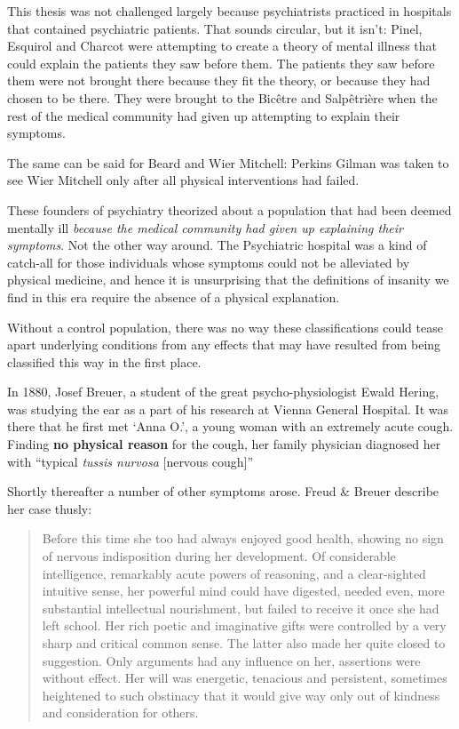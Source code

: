 \begin{refsection}
This thesis was not challenged largely because psychiatrists practiced in hospitals that contained psychiatric patients. That sounds circular, but it isn't: Pinel, Esquirol and Charcot were attempting to create a theory of mental illness that could explain the patients they saw before them. The patients they saw before them were not brought there because they fit the theory, or because they had chosen to be there. They were brought to the Bicêtre and Salpêtrière when the rest of the medical community had given up attempting to explain their symptoms.

The same can be said for Beard and Wier Mitchell: Perkins Gilman was taken to see Wier Mitchell only after all physical interventions had failed.

These founders of psychiatry theorized about a population that had been deemed mentally ill \emph{because the medical community had given up explaining their symptoms}. Not the other way around. The Psychiatric hospital was a kind of catch-all for those individuals whose symptoms could not be alleviated by physical medicine, and hence it is unsurprising that the definitions of insanity we find in this era require the absence of a physical explanation.

Without a control population, there was no way these classifications could tease apart underlying conditions from any effects that may have resulted from being classified this way in the first place. 

In 1880, Josef Breuer, a student of the great psycho-physiologist Ewald Hering, was studying the ear as a part of his research at Vienna General Hospital. It was there that he first met `Anna O.', a young woman with an extremely acute cough. Finding \textbf{no physical reason} for the cough, her family physician diagnosed her with “typical \emph{tussis nurvosa} [nervous cough]” ~\citep[p 27]{Freud:kVwxqGOZ} 

Shortly thereafter a number of other symptoms arose. Freud \& Breuer describe her case thusly:

\begin{quote}

Before this time she too had always enjoyed good health, showing no sign of nervous indisposition during her development. Of considerable intelligence, remarkably acute powers of reasoning, and a clear-sighted intuitive sense, her powerful mind could have digested, needed even, more substantial intellectual nourishment, but failed to receive it once she had left school. Her rich poetic and imaginative gifts were controlled by a very sharp and critical common sense. The latter also made her quite closed to suggestion. Only arguments had any influence on her, assertions were without effect. Her will was energetic, tenacious and persistent, sometimes heightened to such obstinacy that it would give way only out of kindness and consideration for others.


\end{quote}
\end{refsection}
